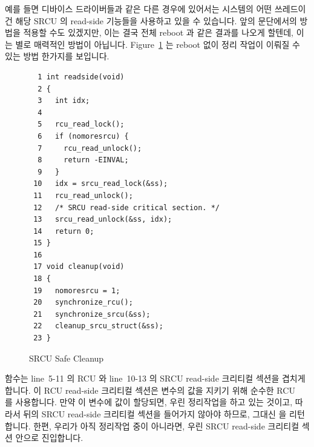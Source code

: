 예를 들면 디바이스 드라이버들과 같은 다른 경우에 있어서는 시스템의 어떤
쓰레드이건 해당 SRCU 의 read-side 기능들을 사용하고 있을 수 있습니다.
앞의 문단에서의 방법을 적용할 수도 있겠지만, 이는 결국 전체 reboot 과 같은
결과를 나오게 할텐데, 이는 별로 매력적인 방법이 아닙니다.
Figure~\ref{fig:app:rcuimpl:SRCU Safe Cleanup} 는 reboot 없이 정리 작업이
이뤄질 수 있는 방법 한가지를 보입니다.

\begin{figure}[htbp]
{ \scriptsize
\begin{verbatim}
  1 int readside(void)
  2 {
  3   int idx;
  4
  5   rcu_read_lock();
  6   if (nomoresrcu) {
  7     rcu_read_unlock();
  8     return -EINVAL;
  9   }
 10   idx = srcu_read_lock(&ss);
 11   rcu_read_unlock();
 12   /* SRCU read-side critical section. */
 13   srcu_read_unlock(&ss, idx);
 14   return 0;
 15 }
 16
 17 void cleanup(void)
 18 {
 19   nomoresrcu = 1;
 20   synchronize_rcu();
 21   synchronize_srcu(&ss);
 22   cleanup_srcu_struct(&ss);
 23 }
\end{verbatim}
}
\caption{SRCU Safe Cleanup}
\label{fig:app:rcuimpl:SRCU Safe Cleanup}
\end{figure}

 함수는 line~5-11 의 RCU 와 line~10-13 의 SRCU read-side
크리티컬 섹션을 겹치게 합니다.
이 RCU read-side 크리티컬 섹션은  변수의 값을 지키기 위해 순수한
RCU~\cite{PaulEdwardMcKenneyPhD} 를 사용합니다.
만약 이 변수에 값이 할당되면, 우린 정리작업을 하고 있는 것이고, 따라서 뒤의
SRCU read-side 크리티컬 섹션을 들어가지 않아야 하므로, 그대신  을
리턴합니다.
한편, 우리가 아직 정리작업 중이 아니라면, 우린 SRCU read-side 크리티컬 섹션
안으로 진입합니다.
\iffalse

